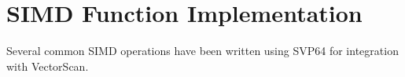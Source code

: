 \chapter{SIMD Function Implementation}

Several common SIMD operations have been written using SVP64 for integration
with VectorScan.